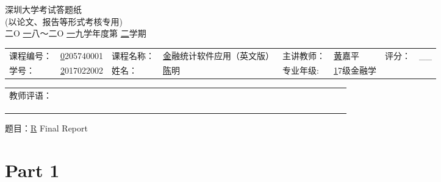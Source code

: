 \documentclass{zjureport}
\newcommand{\coursenum}{0205740001}
\newcommand{\coursename}{金融统计软件应用（英文版）}
\newcommand{\lecturer}{黄嘉平}
\newcommand{\studentnum}{2017022002}
\newcommand{\yourname}{陈明}
\newcommand{\major}{17级金融学}
\newcommand{\firstyear}{一八}
\newcommand{\secondyear}{一九}
\newcommand{\term}{二}
\newcommand{\titleofpaper}{R Final Report}
\begin{document}
\begin{center}
	\Huge{深圳大学考试答题纸}\\
	\large(以论文、报告等形式考核专用)\\
	\large 二O \underline\firstyear ～二O \underline\secondyear 学年度第 \underline\term  学期
\end{center}

\thispagestyle{empty}%

\begin{table}[!htbp]
  \centering
  \begin{tabular*}{\linewidth}{llllllll}
    课程编号： & \underline\coursenum   & 课程名称： & \underline\coursename   & 主讲教师： &  \underline\lecturer &
    评分： & \_\_ \\  学号：&\underline\studentnum  & 姓名：& \underline\yourname & 专业年级: & \underline\major
  \end{tabular*}
\end{table}

\begin{table}[h] 
	\centering  
			\begin{tabular}{|c c c c c c c c c c c c c c c c c c c c c c c c c c c c c c c c c c c|}   %
			\hline
				\large 教师评语： & & & & &  & & & & &  & & & & &  & & & & & & &  & & & & & & & &  & & &  &\\
				 & & & & &  & & & & &  & & & & &  & & & & & & &  & & & & & & & &  & & &  &\\
				 & & & & &  & & & & &  & & & & &  & & & & & & &  & & & & & & & &  & & &  &\\
				 & & & & & & & & & &  & & & & &  & & & & & & &  & & & & & & & &  & & &  &\\
			\hline
			\end{tabular}
\end{table}

\large 题目：\underline\titleofpaper

\tableofcontents
\newpage
\section{Part 1}
\end{document}
